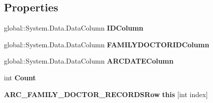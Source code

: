 \subsection*{Properties}
\begin{CompactItemize}
\item 
global::System.Data.DataColumn \textbf{IDColumn}\hspace{0.3cm}{\tt  [get]}\label{class_automatic_medical_system_1_1_data_set1_1_1_a_r_c___f_a_m_i_l_y___d_o_c_t_o_r___r_e_c_o_r_d_s_data_table_adfabafb0b76fb60d050ad0ac198f805}

\item 
global::System.Data.DataColumn \textbf{FAMILYDOCTORIDColumn}\hspace{0.3cm}{\tt  [get]}\label{class_automatic_medical_system_1_1_data_set1_1_1_a_r_c___f_a_m_i_l_y___d_o_c_t_o_r___r_e_c_o_r_d_s_data_table_0f560a73d2a745963b4b073dba08741d}

\item 
global::System.Data.DataColumn \textbf{ARCDATEColumn}\hspace{0.3cm}{\tt  [get]}\label{class_automatic_medical_system_1_1_data_set1_1_1_a_r_c___f_a_m_i_l_y___d_o_c_t_o_r___r_e_c_o_r_d_s_data_table_44ec0b57c149e18e052def1823fcae6c}

\item 
int \textbf{Count}\hspace{0.3cm}{\tt  [get]}\label{class_automatic_medical_system_1_1_data_set1_1_1_a_r_c___f_a_m_i_l_y___d_o_c_t_o_r___r_e_c_o_r_d_s_data_table_32b8c2f1505cc893c45de592508ef912}

\item 
{\bf ARC\_\-FAMILY\_\-DOCTOR\_\-RECORDSRow} \textbf{this} [int index]\hspace{0.3cm}{\tt  [get]}\label{class_automatic_medical_system_1_1_data_set1_1_1_a_r_c___f_a_m_i_l_y___d_o_c_t_o_r___r_e_c_o_r_d_s_data_table_e9fe08659ba2d7813ee6847c42a5770c}

\end{CompactItemize}
